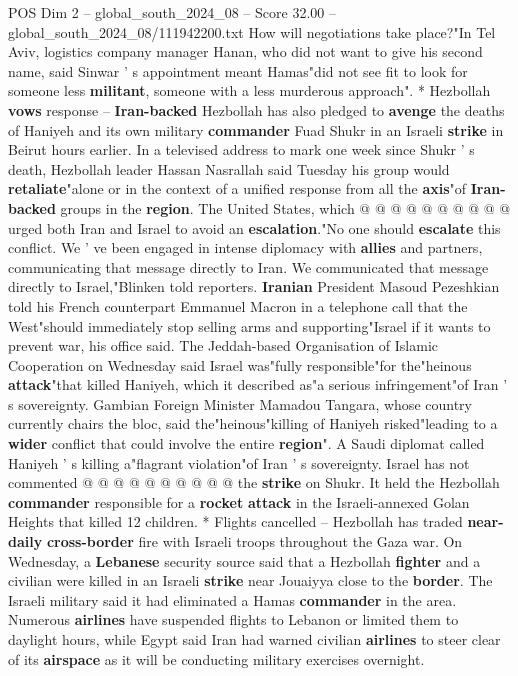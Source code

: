 \begin{textsample}{POS Dim 2 – global\_south\_2024\_08 – Score 32.00 – global\_south\_2024\_08/111942200.txt}
How will negotiations take place?"In Tel Aviv, logistics company manager Hanan, who did not want to give his second name, said Sinwar ' s appointment meant Hamas"did not see fit to look for someone less \textbf{militant}, someone with a less murderous approach". * Hezbollah \textbf{vows} response -- \textbf{Iran-backed} Hezbollah has also pledged to \textbf{avenge} the deaths of Haniyeh and its own military \textbf{commander} Fuad Shukr in an Israeli \textbf{strike} in Beirut hours earlier.
In a televised address to mark one week since Shukr ' s death, Hezbollah leader Hassan Nasrallah said Tuesday his group would \textbf{retaliate}"alone or in the context of a unified response from all the \textbf{axis}"of \textbf{Iran-backed} groups in the \textbf{region}.
The United States, which @ @ @ @ @ @ @ @ @ @ urged both Iran and Israel to avoid an \textbf{escalation}."No one should \textbf{escalate} this conflict.
We ' ve been engaged in intense diplomacy with \textbf{allies} and partners, communicating that message directly to Iran.
We communicated that message directly to Israel,"Blinken told reporters. \textbf{Iranian} President Masoud Pezeshkian told his French counterpart Emmanuel Macron in a telephone call that the West"should immediately stop selling arms and supporting"Israel if it wants to prevent war, his office said.
The Jeddah-based Organisation of Islamic Cooperation on Wednesday said Israel was"fully responsible"for the"heinous \textbf{attack}"that killed Haniyeh, which it described as"a serious infringement"of Iran ' s sovereignty.
Gambian Foreign Minister Mamadou Tangara, whose country currently chairs the bloc, said the"heinous"killing of Haniyeh risked"leading to a \textbf{wider} conflict that could involve the entire \textbf{region}".
A Saudi diplomat called Haniyeh ' s killing a"flagrant violation"of Iran ' s sovereignty.
Israel has not commented @ @ @ @ @ @ @ @ @ @ the \textbf{strike} on Shukr.
It held the Hezbollah \textbf{commander} responsible for a \textbf{rocket} \textbf{attack} in the Israeli-annexed Golan Heights that killed 12 children. * Flights cancelled -- Hezbollah has traded \textbf{near-daily} \textbf{cross-border} fire with Israeli troops throughout the Gaza war.
On Wednesday, a \textbf{Lebanese} security source said that a Hezbollah \textbf{fighter} and a civilian were killed in an Israeli \textbf{strike} near Jouaiyya close to the \textbf{border}.
The Israeli military said it had eliminated a Hamas \textbf{commander} in the area.
Numerous \textbf{airlines} have suspended flights to Lebanon or limited them to daylight hours, while Egypt said Iran had warned civilian \textbf{airlines} to steer clear of its \textbf{airspace} as it will be conducting military exercises overnight.

\end{textsample}
